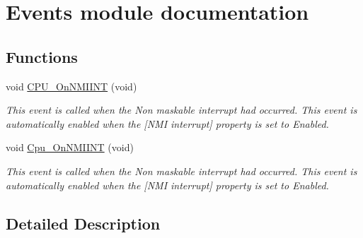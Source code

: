 \hypertarget{group___events__module}{}\section{Events module documentation}
\label{group___events__module}
\subsection*{Functions}
\begin{DoxyCompactItemize}
\item 
\mbox{\label{group___events__module_ga9eb851acc4e1072d1f1a99e9bf2d5be3}} 
void \hyperlink{group___events__module_ga9eb851acc4e1072d1f1a99e9bf2d5be3}{C\+P\+U\+\_\+\+On\+N\+M\+I\+I\+NT} (void)
\begin{DoxyCompactList}\small\item\em This event is called when the Non maskable interrupt had occurred. This event is automatically enabled when the \mbox{[}N\+MI interrupt\mbox{]} property is set to \textquotesingle{}Enabled\textquotesingle{}. \end{DoxyCompactList}\item 
\mbox{\label{group___events__module_ga960d094664356278ac5472d45a6ea2f3}} 
void \hyperlink{group___events__module_ga960d094664356278ac5472d45a6ea2f3}{Cpu\+\_\+\+On\+N\+M\+I\+I\+NT} (void)
\begin{DoxyCompactList}\small\item\em This event is called when the Non maskable interrupt had occurred. This event is automatically enabled when the \mbox{[}N\+MI interrupt\mbox{]} property is set to \textquotesingle{}Enabled\textquotesingle{}. \end{DoxyCompactList}\end{DoxyCompactItemize}


\subsection{Detailed Description}
